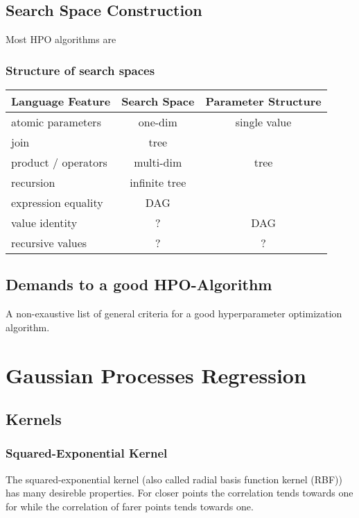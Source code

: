 \documentclass[english]{article}
\begin{document}
\subsection{Search Space Construction}

Most \ac{HPO} algorithms are

\subsubsection{Structure of search spaces}


\begin{tabular}{ l | c | c }
Language Feature & Search Space & Parameter Structure \\
\hline
atomic parameters   & one-dim          & single value \\
join                & tree             &              \\
product / operators & multi-dim        & tree         \\
recursion           & infinite tree    &              \\
expression equality & DAG              &              \\
value identity      & ?                & DAG          \\
recursive values    & ?                & ?
\end{tabular}



\subsection{Demands to a good HPO-Algorithm}
A non-exaustive list of general criteria for a good hyperparameter optimization algorithm.

\section{Gaussian Processes Regression}

\subsection{Kernels}
\subsubsection{Squared-Exponential Kernel}
The squared-exponential kernel (also called radial basis function kernel (RBF)) has many desireble properties. For closer points the correlation tends towards one for while the correlation of farer points tends towards one.
\end{document}
